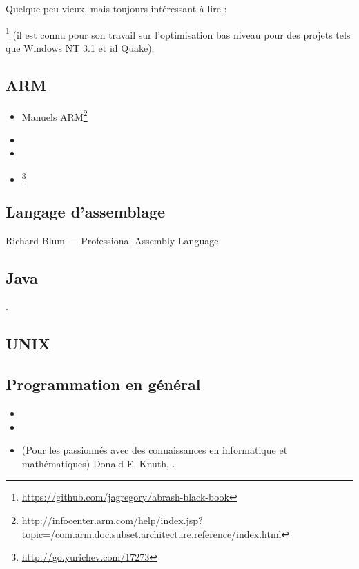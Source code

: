 Quelque peu vieux, mais toujours intéressant à lire :

\MAbrash\footnote{\AlsoAvailableAs \url{https://github.com/jagregory/abrash-black-book}}
(il est connu pour son travail sur l'optimisation bas niveau pour des projets tels que Windows NT 3.1 et id Quake).

\subsection{ARM}

\begin{itemize}
\item Manuels ARM\footnote{\AlsoAvailableAs \url{http://infocenter.arm.com/help/index.jsp?topic=/com.arm.doc.subset.architecture.reference/index.html}}

\item \ARMSevenRef

\item \ARMSixFourRefURL

\item \ARMCookBook\footnote{\AlsoAvailableAs \url{http://go.yurichev.com/17273}}
\end{itemize}

\subsection{Langage d'assemblage}

Richard Blum --- Professional Assembly Language.

\subsection{Java}

\JavaBook.

\subsection{UNIX}

\TAOUP

\subsection{Programmation en général}

\begin{itemize}

\item \RobPikePractice

\item \HenryWarren

\item{(Pour les passionnés avec des connaissances en informatique et mathématiques) Donald E. Knuth, }.

\end{itemize}




